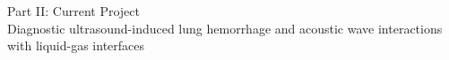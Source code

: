\begin{frame}
  \centering
  \begin{center}
    {\LARGE Part II: Current Project}\\
    
    Diagnostic ultrasound-induced lung hemorrhage and acoustic wave
    interactions with liquid-gas interfaces
  \end{center}
\end{frame}

